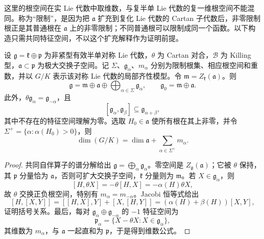这里的根空间在实 Lie 代数中取维数，与复半单 Lie 代数的复一维根空间不能混同。称为“限制”，是因为把 \(\mathfrak a\) 扩充到复化 Lie 代数的 Cartan 子代数后，非零限制根正是其普通根在 \(\mathfrak a\) 上的非零限制；不同普通根可以限制成同一个函数。以下构造只需共同特征空间，不以这个扩充解释作为证明前提。

\begin{proposition}\label{g3:prop:restricted-root-decomposition}
	设 \(\mathfrak g=\mathfrak k\oplus\mathfrak p\) 为非紧型有效半单对称 Lie 代数，\(\theta\) 为 Cartan 对合，\(\mathcal B\) 为 Killing 型，\(\mathfrak a\subset\mathfrak p\) 为极大交换子空间。记 \(\Sigma\)、\(\mathfrak g_\alpha\)、\(m_\alpha\) 分别为限制根集、相应根空间和重数，并以 \(G/K\) 表示该对称 Lie 代数的局部齐性模型。令 \(\mathfrak m=Z_{\mathfrak k}(\mathfrak a)\)。则
	\begin{equation}\label{g3:eq:restricted-root-decomposition}
		\mathfrak g=\mathfrak m\oplus\mathfrak a
		\oplus\bigoplus_{\alpha\in\Sigma}\mathfrak g_\alpha,
		\qquad \mathfrak g_0=\mathfrak m\oplus\mathfrak a.
	\end{equation}
	此外，\(\theta\mathfrak g_\alpha=\mathfrak g_{-\alpha}\)，且
	\[
		[\mathfrak g_\alpha,\mathfrak g_\beta]\subseteq\mathfrak g_{\alpha+\beta},
	\]
	其中不存在的特征空间理解为零。选取 \(H_0\in\mathfrak a\) 使所有根在其上非零，并令 \(\Sigma^+=\{\alpha:\alpha(H_0)>0\}\)，则
	\begin{equation}\label{g3:eq:restricted-root-dimension}
		\dim(G/K)=\dim\mathfrak a+\sum_{\alpha\in\Sigma^+}m_\alpha.
	\end{equation}
\end{proposition}
\begin{proof}
	共同自伴算子的谱分解给出 \(\mathfrak g=\bigoplus_\alpha\mathfrak g_\alpha\)。零空间是 \(Z_{\mathfrak g}(\mathfrak a)\)；它被 \(\theta\) 保持，其 \(\mathfrak p\) 分量恰为 \(\mathfrak a\)，否则可扩大交换子空间，\(\mathfrak k\) 分量则为 \(\mathfrak m\)。若 \(X\in\mathfrak g_\alpha\)，则
	\[
		[H,\theta X]=-\theta[H,X]=-\alpha(H)\theta X,
	\]
	故 \(\theta\) 交换正负根空间，特别有 \(m_\alpha=m_{-\alpha}\)。Jacobi 恒等式给出
	\[
		[H,[X,Y]]=[[H,X],Y]+[X,[H,Y]]
		=(\alpha(H)+\beta(H))[X,Y],
	\]
	证明括号关系。最后，每对 \(\mathfrak g_\alpha\oplus\mathfrak g_{-\alpha}\) 的 \(-1\) 特征空间为
	\[
		\mathfrak p_\alpha=\{X-\theta X:X\in\mathfrak g_\alpha\},
	\]
	其维数为 \(m_\alpha\)，与 \(\mathfrak a\) 一起直和为 \(\mathfrak p\)，于是得到维数公式。
\end{proof}

